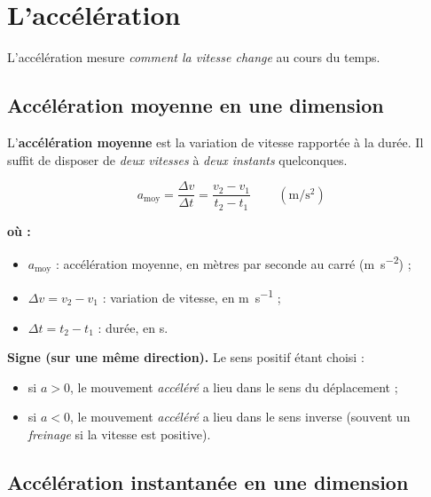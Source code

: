 \documentclass[11pt,a4paper]{article}
\newenvironment{ou}{%
  \par\smallskip\noindent\textbf{où :}\nopagebreak
  \begin{itemize}[leftmargin=1.8em,topsep=2pt,itemsep=1.5pt,parsep=0pt]}%
  {\end{itemize}}
\newcommand{\mss}{\si{\metre\per\second\squared}}
\begin{document}
\section{L'accélération}
L'accélération mesure \emph{comment la vitesse change} au cours du temps.

\subsection{Accélération moyenne en une dimension}

\begin{definition}
L'\textbf{accélération moyenne} est la variation de vitesse rapportée à la durée. Il suffit de
disposer de \emph{deux vitesses} à \emph{deux instants} quelconques.
\end{definition}

\begin{formule}
\[ \boxed{\,a_{\text{moy}}=\dfrac{\Delta v}{\Delta t}=\dfrac{v_2-v_1}{t_2-t_1}\,}\qquad(\mss) \]
\begin{ou}
  \item $a_{\text{moy}}$ : accélération moyenne, en mètres par seconde au carré (\si{\metre\per\second\squared}) ;
  \item $\Delta v = v_2 - v_1$ : variation de vitesse, en \si{\metre\per\second} ;
  \item $\Delta t = t_2 - t_1$ : durée, en \si{\second}.
\end{ou}
\end{formule}

\noindent\textbf{Signe (sur une même direction).} Le sens positif étant choisi :
\begin{itemize}[leftmargin=1.6em,topsep=2pt]
  \item si $a>0$, le mouvement \emph{accéléré} a lieu dans le sens du déplacement ;
  \item si $a<0$, le mouvement \emph{accéléré} a lieu dans le sens inverse (souvent un \emph{freinage} si la vitesse est positive).
\end{itemize}

\subsection{Accélération instantanée en une dimension}
\end{document}
